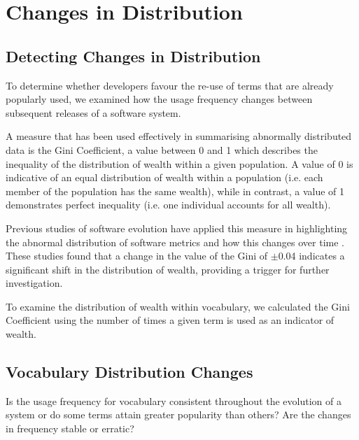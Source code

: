 

\section{Changes in Distribution} %
\label{sec:changes_in_distribution}

\subsection{Detecting Changes in Distribution} %
\label{sub:detecting_changes_in_distribution}

To determine whether developers favour the re-use of terms that are already popularly used, we examined how the usage frequency changes between subsequent releases of a software system.

A measure that has been used effectively in summarising abnormally distributed data is the Gini Coefficient, a value between 0 and 1 which describes the inequality of the distribution of wealth within a given population. A value of 0 is indicative of an equal distribution of wealth within a population (i.e. each member of the population has the same wealth), while in contrast, a value of 1 demonstrates perfect inequality (i.e. one individual accounts for all wealth).

Previous studies of software evolution have applied this measure in highlighting the abnormal distribution of software metrics and how this changes over time \cite{Vasa09a}. These studies found that a change in the value of the Gini of $\pm$0.04 indicates a significant shift in the distribution of wealth, providing a trigger for further investigation. 

To examine the distribution of wealth within vocabulary, we calculated the Gini Coefficient using the number of times a given term is used as an indicator of wealth.


\subsection{Vocabulary Distribution Changes} %
\label{ssub:vocabulary_distribution_changes}

Is the usage frequency for vocabulary consistent throughout the evolution of a system or do some terms attain greater popularity than others? Are the changes in frequency stable or erratic?

